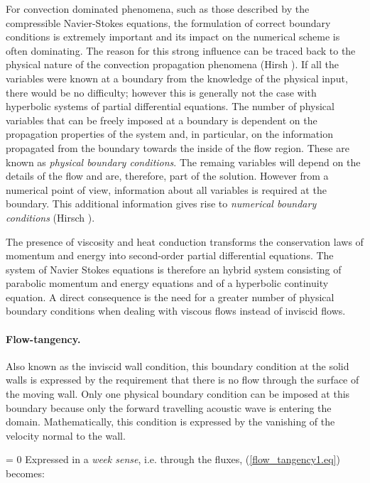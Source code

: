 %
%
%
 For convection dominated phenomena, such as those described by the 
 compressible Navier-Stokes equations, the formulation of correct boundary
 conditions is extremely important and its impact on the numerical scheme
 is often dominating.
 The reason for this strong influence can be traced back to the physical nature of
 the convection propagation phenomena (Hirsh ).
 If all the variables were known at a boundary from the knowledge of the
 physical input, there would be no difficulty; however this is generally not the
 case with hyperbolic systems of partial differential equations.
 The number of physical
 variables that can be freely imposed at a boundary is dependent on the propagation
 properties of the system and, in particular, on the information propagated from
 the boundary towards the inside of the flow region. These are known as
 {\em physical boundary conditions}. The remaing variables will depend on the
 details of the flow and are, therefore, part of the solution. However
 from a numerical point of view, information about all variables
 is required  at the boundary. This additional information gives rise to
 {\em numerical boundary conditions} (Hirsch ).
 
 The presence of viscosity and heat conduction
 transforms the conservation laws of momentum and energy into second-order
 partial differential equations.
 The system of Navier Stokes equations is therefore an hybrid system consisting of
 parabolic momentum and energy equations and of a hyperbolic continuity equation.
 A direct consequence is the need for a greater number
 of physical boundary conditions when dealing with viscous flows instead of
 inviscid flows.
%
%
\paragraph{Flow-tangency.}
%
 Also known as the inviscid wall condition, this boundary condition at the solid walls
 is expressed by the requirement that there is no flow through the surface
 of the moving wall. Only one physical boundary condition can be imposed
 at this boundary because only the forward travelling acoustic wave is entering
 the domain. Mathematically, this condition is expressed by the vanishing of the
 velocity normal to the wall.

%
\beq
  \cdot{} = 0
  \label{flow_tangency1.eq}
\eeq
%
 Expressed in a {\em week sense}, i.e. through the fluxes, (\ref{flow_tangency1.eq})
 becomes:

